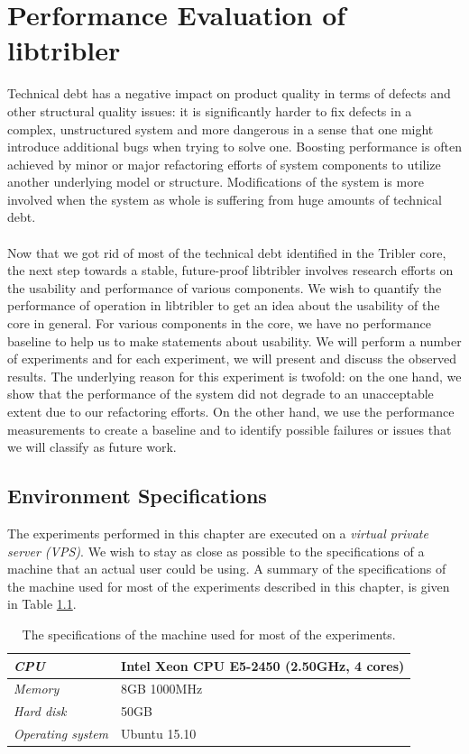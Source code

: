 \chapter{Performance Evaluation of libtribler}
\label{chapter:experiments}

Technical debt has a negative impact on product quality in terms of defects and other structural quality issues\cite{tom2013exploration}: it is significantly harder to fix defects in a complex, unstructured system and more dangerous in a sense that one might introduce additional bugs when trying to solve one. Boosting performance is often achieved by minor or major refactoring efforts of system components to utilize another underlying model or structure. Modifications of the system is more involved when the system as whole is suffering from huge amounts of technical debt.\\\\
Now that we got rid of most of the technical debt identified in the Tribler core, the next step towards a stable, future-proof libtribler involves research efforts on the usability and performance of various components. We wish to quantify the performance of operation in libtribler to get an idea about the usability of the core in general. For various components in the core, we have no performance baseline to help us to make statements about usability. We will perform a number of experiments and for each experiment, we will present and discuss the observed results. The underlying reason for this experiment is twofold: on the one hand, we show that the performance of the system did not degrade to an  unacceptable extent due to our refactoring efforts. On the other hand, we use the performance measurements to create a baseline and to identify possible failures or issues that we will classify as future work.

\section{Environment Specifications}
\label{sec:environment-specifications}
The experiments performed in this chapter are executed on a \emph{virtual private server (VPS)}. We wish to stay as close as possible to the specifications of a machine that an actual user could be using. A summary of the specifications of the machine used for most of the experiments described in this chapter, is given in Table \ref{table:experiments-server-specifications}.

\begin{table}[h!]
	\centering
	\begin{tabular}{|l|l|}
		\hline
		\emph{CPU} & Intel Xeon CPU E5-2450 (2.50GHz, 4 cores)\\ \hline
		\emph{Memory} & 8GB 1000MHz \\ \hline
		\emph{Hard disk} & 50GB \\ \hline
		\emph{Operating system} & Ubuntu 15.10 \\ \hline
	\end{tabular}
	\caption{The specifications of the machine used for most of the experiments.}
	\label{table:experiments-server-specifications}
\end{table}

